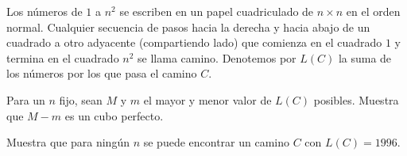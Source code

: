 Los números de $1$ a $n^2$ se escriben en un papel cuadriculado de $n\times n$ en el orden normal. Cualquier secuencia de pasos hacia la derecha y hacia abajo de un cuadrado a otro adyacente (compartiendo lado) que comienza en el cuadrado $1$ y termina en el cuadrado $n^2$ se llama camino. Denotemos por $L(C)$ la suma de los números por los que pasa el camino $C$.

Para un $n$ fijo, sean $M$ y $m$ el mayor y menor valor de $L(C)$ posibles. Muestra que $M-m$ es un cubo perfecto.

Muestra que para ningún $n$ se puede encontrar un camino $C$ con $L(C) = 1996$.